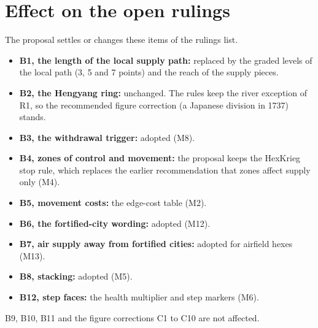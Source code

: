 \documentclass[11pt]{article}
\begin{document}
\section{Effect on the open rulings}\label{sec:rulings}
The proposal settles or changes these items of the rulings list.
\begin{itemize}
\item \textbf{B1, the length of the local supply path:} replaced by the graded levels of the local path (3, 5 and 7 points) and the reach of the supply pieces.
\item \textbf{B2, the Hengyang ring:} unchanged. The rules keep the river exception of R1, so the recommended figure correction (a Japanese division in 1737) stands.
\item \textbf{B3, the withdrawal trigger:} adopted (M8).
\item \textbf{B4, zones of control and movement:} the proposal keeps the HexKrieg stop rule, which replaces the earlier recommendation that zones affect supply only (M4).
\item \textbf{B5, movement costs:} the edge-cost table (M2).
\item \textbf{B6, the fortified-city wording:} adopted (M12).
\item \textbf{B7, air supply away from fortified cities:} adopted for airfield hexes (M13).
\item \textbf{B8, stacking:} adopted (M5).
\item \textbf{B12, step faces:} the health multiplier and step markers (M6).
\end{itemize}
B9, B10, B11 and the figure corrections C1 to C10 are not affected.
\end{document}
